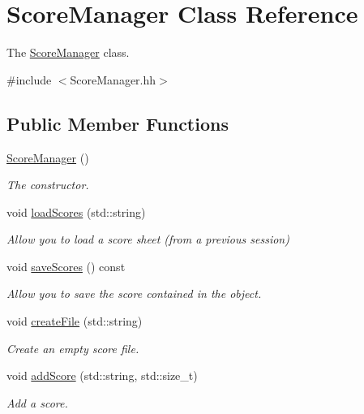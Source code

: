 \hypertarget{classScoreManager}{}\section{Score\+Manager Class Reference}
\label{classScoreManager}


The \hyperlink{classScoreManager}{Score\+Manager} class.  




{\ttfamily \#include $<$Score\+Manager.\+hh$>$}

\subsection*{Public Member Functions}
\begin{DoxyCompactItemize}
\item 
\hyperlink{classScoreManager_a4f3866ff832127664543349da5c4fbf4}{Score\+Manager} ()
\begin{DoxyCompactList}\small\item\em The constructor. \end{DoxyCompactList}\item 
void \hyperlink{classScoreManager_a3644cf37cdce0983dc8ed3005222e55a}{load\+Scores} (std\+::string)
\begin{DoxyCompactList}\small\item\em Allow you to load a score sheet (from a previous session) \end{DoxyCompactList}\item 
\mbox{\label{classScoreManager_aa3f390fe5076324b2d457de0c43af59f}} 
void \hyperlink{classScoreManager_aa3f390fe5076324b2d457de0c43af59f}{save\+Scores} () const
\begin{DoxyCompactList}\small\item\em Allow you to save the score contained in the object. \end{DoxyCompactList}\item 
void \hyperlink{classScoreManager_a93810ab5b58af22f8af96db0787363b8}{create\+File} (std\+::string)
\begin{DoxyCompactList}\small\item\em Create an empty score file. \end{DoxyCompactList}\item 
void \hyperlink{classScoreManager_a2597a2f7d0786295a6ee3445502a6d6f}{add\+Score} (std\+::string, std\+::size\+\_\+t)
\begin{DoxyCompactList}\small\item\em Add a score. \end{DoxyCompactList}\item 

\end{DoxyCompactItemize}
